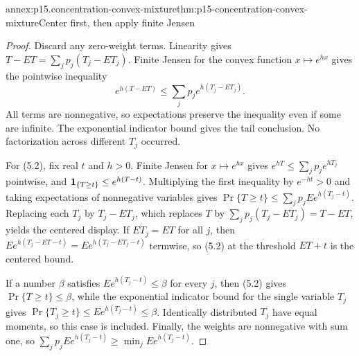 \begin{annexitem}{annex:p15.concentration-convex-mixture}{thm:p15-concentration-convex-mixture}{Center first, then apply finite Jensen}
\begin{proof}
Discard any zero-weight terms.
Linearity gives \(T-ET=\sum_jp_j(T_j-ET_j)\).
Finite Jensen for the convex function \(x\mapsto e^{hx}\) gives
the pointwise inequality
\[
 e^{h(T-ET)}\leq\sum_jp_je^{h(T_j-ET_j)}.
\]
All terms are nonnegative, so expectations preserve the inequality
even if some are infinite. The exponential indicator bound gives the
tail conclusion. No factorization across different \(T_j\) occurred.

For (5.2), fix real \(t\) and \(h>0\). Finite Jensen for
\(x\mapsto e^{hx}\) gives \(e^{hT}\leq\sum_jp_je^{hT_j}\) pointwise, and
\({\bf1}_{\{T\geq t\}}\leq e^{h(T-t)}\). Multiplying the first inequality
by \(e^{-ht}>0\) and taking expectations of nonnegative variables gives
\(\Pr\{T\geq t\}\leq\sum_jp_jEe^{h(T_j-t)}\). Replacing each \(T_j\) by
\(T_j-ET_j\), which replaces \(T\) by
\(\sum_jp_j(T_j-ET_j)=T-ET\), yields the centered display. If
\(ET_j=ET\) for all \(j\), then
\(Ee^{h(T_j-ET-t)}=Ee^{h(T_j-ET_j-t)}\) termwise, so (5.2) at the
threshold \(ET+t\) is the centered bound.

If a number \(\beta\) satisfies \(Ee^{h(T_j-t)}\leq\beta\) for every
\(j\), then (5.2) gives \(\Pr\{T\geq t\}\leq\beta\), while the
exponential indicator bound for the single variable \(T_j\) gives
\(\Pr\{T_j\geq t\}\leq Ee^{h(T_j-t)}\leq\beta\). Identically distributed
\(T_j\) have equal moments, so this case is included. Finally, the
weights are nonnegative with sum one, so
\(\sum_jp_jEe^{h(T_j-t)}\geq\min_jEe^{h(T_j-t)}\).
\end{proof}
\end{annexitem}

